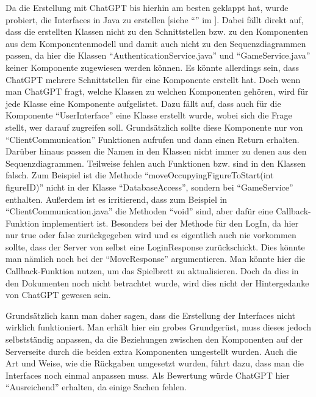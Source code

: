 Da die Erstellung mit ChatGPT bis hierhin am besten geklappt hat, wurde probiert, die Interfaces in Java zu erstellen [siehe ``'' im ]. Dabei fällt 
direkt auf, dass die erstellten Klassen nicht zu den Schnittstellen bzw. zu den Komponenten aus dem Komponentenmodell und damit auch 
nicht zu den Sequenzdiagrammen passen, da hier die Klassen ``AuthenticationService.java'' und ``GameService.java'' keiner Komponente 
zugewiesen werden können. Es könnte allerdings sein, dass ChatGPT mehrere Schnittstellen für eine Komponente erstellt hat. Doch wenn 
man ChatGPT fragt, welche Klassen zu welchen Komponenten gehören, wird für jede Klasse eine Komponente aufgelistet. Dazu fällt auf, dass 
auch für die Komponente ``UserInterface'' eine Klasse erstellt wurde, wobei sich die Frage stellt, wer darauf zugreifen soll. 
Grundsätzlich sollte diese Komponente nur von ``ClientCommunication'' Funktionen aufrufen und dann einen Return erhalten. Darüber hinaus 
passen die Namen in den Klassen nicht immer zu denen aus den Sequenzdiagrammen. Teilweise fehlen auch Funktionen bzw. sind in den 
Klassen falsch. Zum Beispiel ist die Methode ``moveOccupyingFigureToStart(int figureID)'' nicht in der Klasse ``DatabaseAccess'', sondern 
bei ``GameService'' enthalten. Außerdem ist es irritierend, dass zum Beispiel in ``ClientCommunication.java'' die Methoden ``void'' sind, 
aber dafür eine Callback-Funktion implementiert ist. Besonders bei der Methode für den LogIn, da hier nur true oder false 
zurückgegeben wird und es eigentlich auch nie vorkommen sollte, dass der Server von selbst eine LoginResponse zurückschickt. Dies 
könnte man nämlich noch bei der ``MoveResponse'' argumentieren. Man könnte hier die Callback-Funktion nutzen, um das Spielbrett 
zu aktualisieren. Doch da dies in den Dokumenten noch nicht betrachtet wurde, wird dies nicht der Hintergedanke von 
ChatGPT gewesen sein.

Grundsätzlich kann man daher sagen, dass die Erstellung der Interfaces nicht wirklich funktioniert. Man erhält hier ein grobes 
Grundgerüst, muss dieses jedoch selbstständig anpassen, da die Beziehungen zwischen den Komponenten auf der Serverseite durch die 
beiden extra Komponenten umgestellt wurden. Auch die Art und Weise, wie die Rückgaben umgesetzt wurden, führt dazu, dass man die 
Interfaces noch einmal anpassen muss. Als Bewertung würde ChatGPT hier ``Ausreichend'' erhalten, da einige Sachen fehlen.
